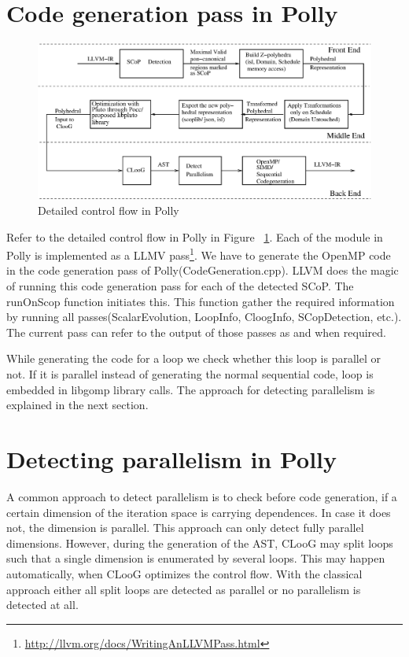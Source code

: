\section{Code generation pass in Polly}
\begin{figure}
\begin{center}
  \includegraphics[width=1\textwidth]{images/detailedarch.eps}
  \caption{Detailed control flow in Polly}
  \label{detailed}
\end{center}
\end{figure}
Refer to the detailed control flow in Polly in Figure ~\ref{detailed}. Each of the module in Polly is
implemented as a LLMV pass\footnote{\url{http://llvm.org/docs/WritingAnLLVMPass.html}}. We have to generate the OpenMP code in the code 
generation pass of Polly(CodeGeneration.cpp). LLVM does the magic of running this code generation
pass for each of the detected SCoP. The runOnScop function initiates this. This function gather
the required information by running all passes(ScalarEvolution, LoopInfo, CloogInfo, SCopDetection, etc.).
The current pass can refer to the output of those passes as and when required. 

While generating the code for a loop we check whether this loop is parallel or not.  If it is
parallel instead of generating the normal sequential code,  loop is embedded in
libgomp library calls. The approach for detecting parallelism is explained in the next section.

\section{Detecting parallelism in Polly}

A common approach to detect
parallelism is to check before code generation, if a certain dimension of the
iteration space is carrying dependences. In case it does not, the dimension is
parallel.  This approach can only detect fully parallel dimensions. However,
during the generation of the AST, CLooG may split loops such that a
single dimension is enumerated by several loops.  This may happen
automatically, when CLooG optimizes the control flow.  With the classical
approach either all split loops are detected as parallel or no parallelism is
detected at all.

